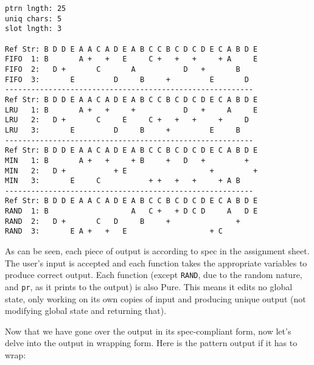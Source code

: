 \documentclass[11pt]{article}
\begin{document}
\begin{lstlisting}
ptrn lngth: 25
uniq chars: 5
slot lngth: 3

Ref Str: B D D E A A C A D E A B C C B C D C D E C A B D E
FIFO  1: B       A +   +   E     C +   +   +     + A     E
FIFO  2:   D +       C       A           D   +       B
FIFO  3:       E         D     B     +         E       D
---------------------------------------------------------
Ref Str: B D D E A A C A D E A B C C B C D C D E C A B D E
LRU   1: B       A +   +     +           D   +     A     E
LRU   2:   D +       C     E     C +   +   +     +     D
LRU   3:       E         D     B     +         E     B
---------------------------------------------------------
Ref Str: B D D E A A C A D E A B C C B C D C D E C A B D E
MIN   1: B       A +   +     + B     +   D   +         +
MIN   2:   D +           + E                   +         +
MIN   3:       E     C           + +   +   +     + A B
---------------------------------------------------------
Ref Str: B D D E A A C A D E A B C C B C D C D E C A B D E
RAND  1: B                   A   C +   + D C D     A   D E
RAND  2:   D +       C   D     B     +               +
RAND  3:       E A +   +   E                   + C
\end{lstlisting}

As can be seen, each piece of output is according to spec in the assignment sheet.
The user's input is accepted and each function takes the appropriate variables to produce correct output.
Each function (except \texttt{RAND}, due to the random nature, and \texttt{pr}, as it prints to the output) is also Pure.
This means it edits no global state, only working on its own copies of input and producing unique output (not modifying global state and returning that).

Now that we have gone over the output in its spec-compliant form, now let's delve into the output in wrapping form.
Here is the pattern output if it has to wrap:
\end{document}
